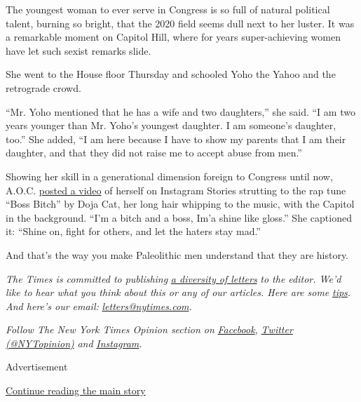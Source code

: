 The youngest woman to ever serve in Congress is so full of natural
political talent, burning so bright, that the 2020 field seems dull next
to her luster. It was a remarkable moment on Capitol Hill, where for
years super-achieving women have let such sexist remarks slide.

She went to the House floor Thursday and schooled Yoho the Yahoo and the
retrograde crowd.

``Mr. Yoho mentioned that he has a wife and two daughters,'' she said.
``I am two years younger than Mr. Yoho's youngest daughter. I am
someone's daughter, too.'' She added, ``I am here because I have to show
my parents that I am their daughter, and that they did not raise me to
accept abuse from men.''

Showing her skill in a generational dimension foreign to Congress until
now, A.O.C.
\href{https://twitter.com/itsbecrose/status/1285692799812341760?ref_src=twsrc\%5Etfw\%7Ctwcamp\%5Etweetembed\%7Ctwterm\%5E1285692799812341760\%7Ctwgr\%5E\&ref_url=https\%3A\%2F\%2Fwww.foxnews.com\%2Fpolitics\%2Faoc-posts-boss-video-yoho-confrontation}{posted
a video} of herself on Instagram Stories strutting to the rap tune
``Boss Bitch'' by Doja Cat, her long hair whipping to the music, with
the Capitol in the background. ``I'm a bitch and a boss, Im'a shine like
gloss.'' She captioned it: ``Shine on, fight for others, and let the
haters stay mad.''

And that's the way you make Paleolithic men understand that they are
history.

\emph{The Times is committed to publishing}
\href{https://www.nytimes.com/2019/01/31/opinion/letters/letters-to-editor-new-york-times-women.html}{\emph{a
diversity of letters}} \emph{to the editor. We'd like to hear what you
think about this or any of our articles. Here are some}
\href{https://help.nytimes.com/hc/en-us/articles/115014925288-How-to-submit-a-letter-to-the-editor}{\emph{tips}}\emph{.
And here's our email:}
\href{mailto:letters@nytimes.com}{\emph{letters@nytimes.com}}\emph{.}

\emph{Follow The New York Times Opinion section on}
\href{https://www.facebook.com/nytopinion}{\emph{Facebook}}\emph{,}
\href{http://twitter.com/NYTOpinion}{\emph{Twitter (@NYTopinion)}}
\emph{and}
\href{https://www.instagram.com/nytopinion/}{\emph{Instagram}}\emph{.}

Advertisement

\protect\hyperlink{after-bottom}{Continue reading the main story}

